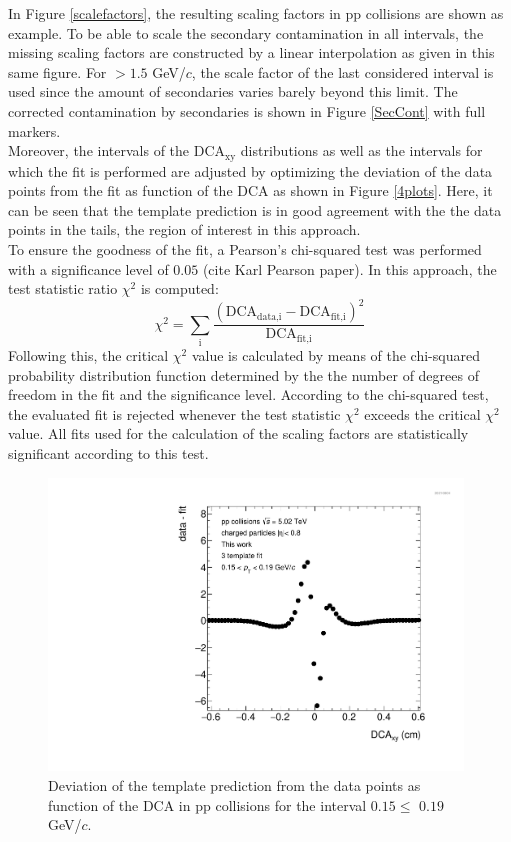 \documentclass[12pt,a4paper]{report}
\begin{document}
In Figure \ref{scalefactors}, the resulting scaling factors in pp collisions are shown as example. To be able to scale the secondary contamination in all \pt intervals, the missing scaling factors are constructed by a linear interpolation as given in this same figure. For \pt $> 1.5$ GeV/$c$, the scale factor of the last considered \pt interval is used since the amount of secondaries varies barely beyond this limit. The corrected contamination by secondaries is shown in Figure \ref{SecCont} with full markers.\\
Moreover, the intervals of the DCA$_{\text{xy}}$ distributions as well as the \pt intervals for which the fit is performed are adjusted by optimizing the deviation of the data points from the fit as function of the DCA as shown in Figure \ref{4plots}. Here, it can be seen that the template prediction is in good agreement with the the data points in the tails, the region of interest in this approach.\\
To ensure the goodness of the fit, a Pearson's chi-squared test was performed with a significance level of $0.05$ (cite Karl Pearson paper). In this approach, the test statistic ratio $\chi^2$ is computed:
\begin{equation}
\chi^2 = \sum_{\text{i}} \dfrac{(\text{DCA}_\text{data,i} - \text{DCA}_\text{fit,i})^2}{\text{DCA}_\text{fit,i}}
\end{equation}
Following this, the critical $\chi^2$ value is calculated by means of the chi-squared probability distribution function determined by the the number of degrees of freedom in the fit and the significance level. According to the chi-squared test, the evaluated fit is rejected whenever the test statistic $\chi^2$ exceeds the critical $\chi^2$ value. All fits used for the calculation of the scaling factors are statistically significant according to this test. 
\begin{figure}[tb!]
\centering
\includegraphics[width=11cm]{Plots/Pulls_Pt0_Mult0.pdf}  
\caption{Deviation of the template prediction from the data points as function of the DCA in pp collisions for the \pt interval $0.15 \leq$ \pt $0.19$ GeV/$c$.}
\label{Pulls}
\end{figure}
\end{document}
